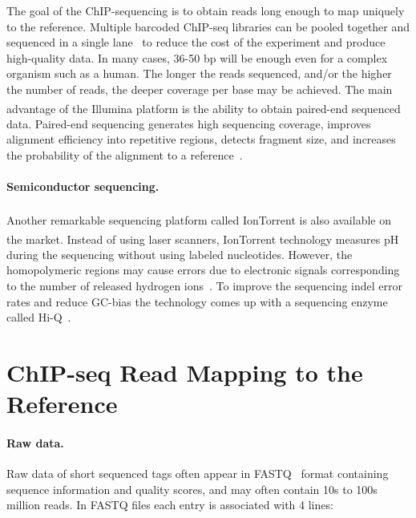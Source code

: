 The goal of the ChIP-sequencing is to obtain reads long enough to map uniquely to the reference. 
Multiple barcoded ChIP-seq libraries can be pooled together and sequenced in a single lane~\cite{craig2008identification} to reduce the cost of the experiment and produce high-quality data.
In many cases, 36-50 bp will be enough even for a complex organism such as a human. 
The longer the reads sequenced, and/or the higher the number of reads, the deeper coverage per base may be achieved.
The main advantage of the Illumina\textsuperscript{\texttrademark} platform is the ability to obtain paired-end sequenced data. 
Paired-end sequencing generates high sequencing coverage, improves alignment efficiency into repetitive regions, detects fragment size, and increases the probability of the alignment to a reference~\cite{kidder2011chip, chen2012systematic}.



\paragraph{Semiconductor sequencing.}
Another remarkable sequencing platform called IonTorrent\textsuperscript{\texttrademark} is also available on the market. 
Instead of using laser scanners, IonTorrent\textsuperscript{\texttrademark} technology measures pH during the sequencing without using labeled nucleotides. 
However, the homopolymeric regions may cause errors due to electronic signals corresponding to the number of released hydrogen ions~\cite{ambardar2016high}.
To improve the sequencing indel error rates and reduce GC-bias the technology comes up with a sequencing enzyme called Hi-Q~\cite{veras2014efficiency}. 










\section{ChIP-seq Read Mapping to the Reference}

\paragraph{Raw data.}
Raw data of short sequenced tags often appear in FASTQ~\cite{fastq} format containing sequence information and quality scores, and may often contain 10s to 100s million reads.
In FASTQ files each entry is associated with 4 lines:


